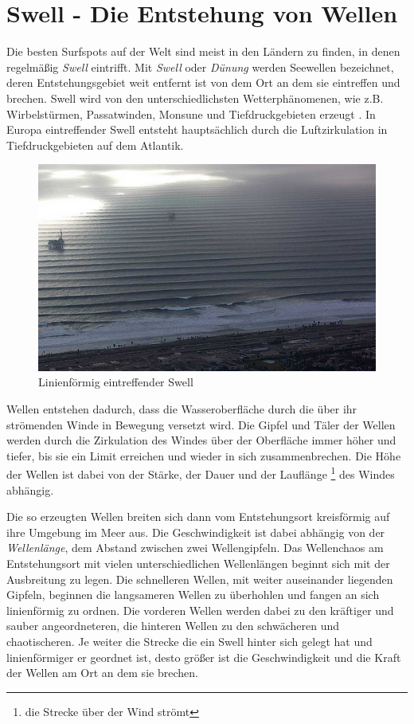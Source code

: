 \section{Swell - Die Entstehung von Wellen}
Die besten Surfspots auf der Welt sind meist in den Ländern zu finden,
in denen regelmäßig \textit{Swell} eintrifft. Mit \textit{Swell} oder
\textit{Dünung} werden Seewellen bezeichnet, deren Entstehungs\-gebiet
weit entfernt ist von dem Ort an dem sie eintreffen und brechen. Swell
wird von den unterschiedlichsten Wetter\-phänomenen, wie
z.B. Wirbelstürmen, Passatwinden, Monsune und Tiefdruckgebieten
erzeugt \cite[S.15]{storm_europe_1998}. In Europa eintreffender Swell
entsteht hauptsächlich durch die Luftzirkulation in Tiefdruckgebieten
auf dem Atlantik.

\begin{figure}[h]
  \begin{center}
    \includegraphics{bilder/swell}
    \caption{Linienförmig eintreffender Swell}
  \end{center}
\end{figure}

Wellen entstehen dadurch, dass die Wasseroberfläche durch die über ihr
strömenden Winde in Bewegung versetzt wird. Die Gipfel und Täler der
Wellen werden durch die Zirkulation des Windes über der Oberfläche
immer höher und tiefer, bis sie ein Limit erreichen und wieder in sich
zusammenbrechen. Die Höhe der Wellen ist dabei von der Stärke, der
Dauer und der Lauflänge \footnote{die Strecke über der Wind strömt}
des Windes abhängig.

Die so erzeugten Wellen breiten sich dann vom Entstehungsort
kreisförmig auf ihre Umgebung im Meer aus. Die Geschwindigkeit ist
dabei abhängig von der \textit{Wellenlänge}, dem Abstand zwischen zwei
Wellengipfeln. Das Wellenchaos am Entstehungsort mit vielen
unterschiedlichen Wellenlängen beginnt sich mit der Ausbreitung zu
legen. Die schnelleren Wellen, mit weiter auseinander liegenden
Gipfeln, beginnen die langsameren Wellen zu überhohlen und fangen an
sich linienförmig zu ordnen. Die vorderen Wellen werden dabei zu den
kräftiger und sauber angeordneteren, die hinteren Wellen zu den
schwächeren und chaotischeren. Je weiter die Strecke die ein Swell
hinter sich gelegt hat und linienförmiger er geordnet ist, desto
größer ist die Geschwindigkeit und die Kraft der Wellen am Ort an dem
sie brechen.


